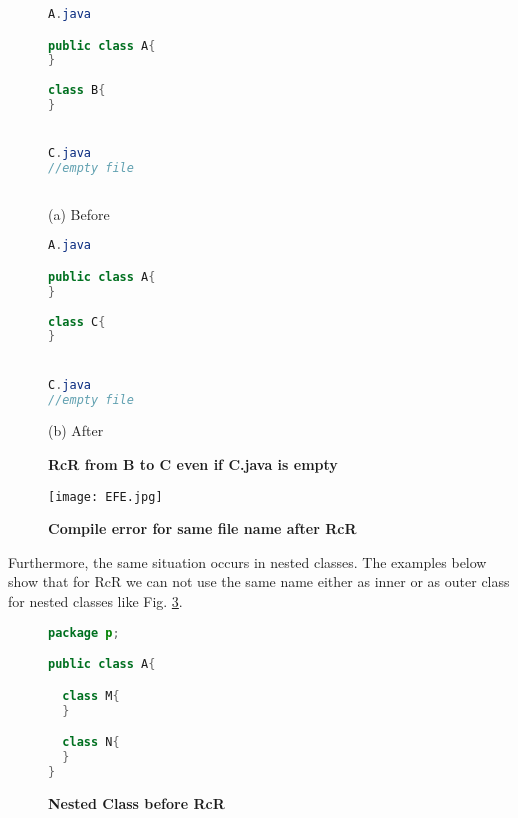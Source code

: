 \begin{figure}[th]
\centering
\begin{minipage}[t]{0.45\linewidth}
\begin{lstlisting}[language=java, basicstyle=\scriptsize\ttfamily,frame=single]
A.java

public class A{
}
	
class B{
}


C.java
//empty file
 
\end{lstlisting}
\centering(a) Before
\end{minipage}
\hfill
\begin{minipage}[t]{0.45\linewidth}
\begin{lstlisting}[language=java, basicstyle=\scriptsize\ttfamily,frame=single]
A.java

public class A{
}
	
class C{
}


C.java
//empty file

\end{lstlisting}
\centering(b) After
\end{minipage}
\caption{\textbf{RcR from B to C even if C.java is empty}}
\label{fig:empty}
\end{figure}

\begin{figure}[H]
\centerline{\texttt{[image: EFE.jpg]}}
\caption{\textbf{Compile error for same file name after RcR}}
\label{fig:efr}
\end{figure}


Furthermore, the same situation occurs in nested classes. The examples below show that for RcR we can not use the same name either as inner or as outer class for nested classes like Fig. \ref{fig:original}.

\begin{figure}[th]
\centering
\begin{minipage}[t]{0.5\linewidth}
\begin{lstlisting}[language=java, basicstyle=\scriptsize\ttfamily,frame=single]
package p;

public class A{	

  class M{
  }

  class N{
  }
} 
\end{lstlisting}
\end{minipage}
\caption{\textbf{Nested Class before RcR}}
\label{fig:original}
\end{figure}

